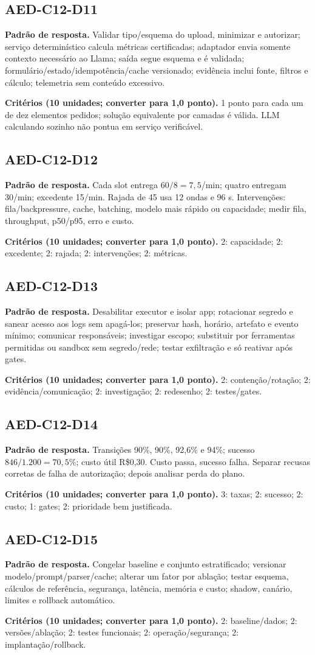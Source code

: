 \documentclass[10pt,a4paper]{article}
\newcommand{\Disc}[3]{\subsection*{#1}\textbf{Padrão de resposta.} #2\par\smallskip\textbf{Critérios (10 unidades; converter para 1,0 ponto).} #3}
\begin{document}
\Disc{AED-C12-D11}{Validar tipo/esquema do upload, minimizar e autorizar; serviço determinístico calcula métricas certificadas; adaptador envia somente contexto necessário ao Llama; saída segue esquema e é validada; formulário/estado/idempotência/cache versionado; evidência inclui fonte, filtros e cálculo; telemetria sem conteúdo excessivo.}{1 ponto para cada um de dez elementos pedidos; solução equivalente por camadas é válida. LLM calculando sozinho não pontua em serviço verificável.}
\Disc{AED-C12-D12}{Cada slot entrega $60/8=7{,}5$/min; quatro entregam 30/min; excedente 15/min. Rajada de 45 usa 12 ondas e 96 s. Intervenções: fila/backpressure, cache, batching, modelo mais rápido ou capacidade; medir fila, throughput, p50/p95, erro e custo.}{2: capacidade; 2: excedente; 2: rajada; 2: intervenções; 2: métricas.}
\Disc{AED-C12-D13}{Desabilitar executor e isolar app; rotacionar segredo e sanear acesso aos logs sem apagá-los; preservar hash, horário, artefato e evento mínimo; comunicar responsáveis; investigar escopo; substituir por ferramentas permitidas ou sandbox sem segredo/rede; testar exfiltração e só reativar após gates.}{2: contenção/rotação; 2: evidência/comunicação; 2: investigação; 2: redesenho; 2: testes/gates.}
\Disc{AED-C12-D14}{Transições 90\%, 90\%, 92,6\% e 94\%; sucesso $846/1.200=70{,}5\%$; custo útil R\$0,30. Custo passa, sucesso falha. Separar recusas corretas de falha de autorização; depois analisar perda do plano.}{3: taxas; 2: sucesso; 2: custo; 1: gates; 2: prioridade bem justificada.}
\Disc{AED-C12-D15}{Congelar baseline e conjunto estratificado; versionar modelo/prompt/parser/cache; alterar um fator por ablação; testar esquema, cálculos de referência, segurança, latência, memória e custo; shadow, canário, limites e rollback automático.}{2: baseline/dados; 2: versões/ablação; 2: testes funcionais; 2: operação/segurança; 2: implantação/rollback.}
\end{document}
